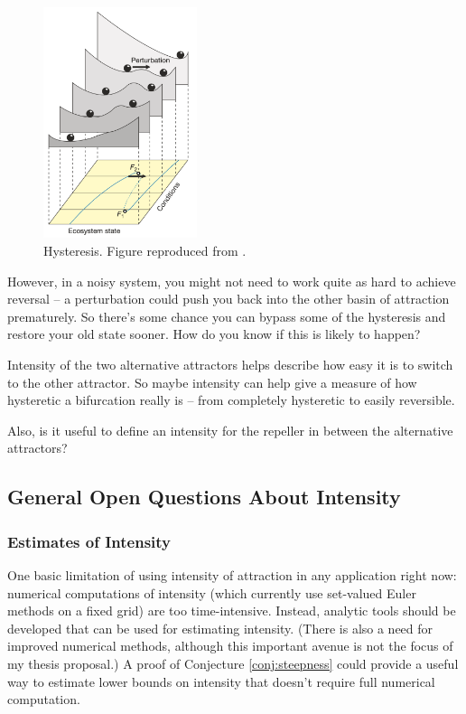 \begin{figure}[ht]
	\centering
	\captionsetup{width=0.4\linewidth}
	\includegraphics[width=0.4\textwidth]{figs/hysteresis}
	\caption{Hysteresis. Figure reproduced from \cite{schefferCatastrophicShiftsEcosystems2001a}.}
	
	\label{fig:hysteresis}
\end{figure} 


However, in a noisy system, you might not need to work quite as hard to achieve reversal -- a perturbation could push you back into the other basin of attraction prematurely. So there's some chance you can bypass some of the hysteresis and restore your old state sooner. How do you know if this is likely to happen?

Intensity of the two alternative attractors helps describe how easy it is to switch to the other attractor. So maybe intensity can help give a measure of how hysteretic a bifurcation really is -- from completely hysteretic to easily reversible.

Also, is it useful to define an intensity for the repeller in between the alternative attractors?

\subsection{General Open Questions About Intensity}

\subsubsection{Estimates of Intensity}
One basic limitation of using intensity of attraction in any application right now: numerical computations of intensity (which currently use set-valued Euler methods on a fixed grid) are too time-intensive. Instead, analytic tools should be developed that can be used for estimating intensity. (There is also a need for improved numerical methods, although this important avenue is not the focus of my thesis proposal.) A proof of Conjecture \ref{conj:steepness} could provide a useful way to estimate lower bounds on intensity that doesn't require full numerical computation. 

